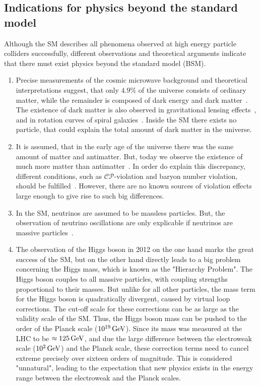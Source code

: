 \subsection{Indications for physics beyond the standard model}\label{sec:SM_bsm}
Although the SM describes all phenomena observed at high energy particle colliders successfully, different observations and theoretical arguments indicate that there must exist physics beyond the standard model (BSM).
\begin{enumerate}
 \item Precise measurements of the cosmic microwave background and theoretical interpretations suggest, that only $4.9\%$ of the universe consists of ordinary matter, while the remainder is composed of dark energy and dark matter~\cite{DarkMatterPlanck}. The existence of dark matter is also observed in gravitational lensing effects~\cite{DarkMatterLensing}, and in rotation curves of spiral galaxies~\cite{DarkMatterRotation}. Inside the SM there exists no particle, that could explain the total amount of dark matter in the universe.
 \item It is assumed, that in the early age of the universe there was the same amount of matter and antimatter. But, today we observe the existence of much more matter than antimatter~\cite{Antimatter,AsymSM}. In order do explain this discrepancy, different conditions, such as $\mathcal{CP}$-violation and baryon number violation, should be fulfilled~\cite{Sakharov}. However, there are no known sources of violation effects large enough to give rise to such big differences.
 \item In the SM, neutrinos are assumed to be massless particles. But, the observation of neutrino oscillations are only explicable if neutrinos are massive particles~\cite{NeutrinoMass,PDG}.
 \item The observation of the Higgs boson in 2012 on the one hand marks the great success of the SM, but on the other hand directly leads to a big problem concerning the Higgs mass, which is known as the "Hierarchy Problem". The Higgs boson couples to all massive particles, with coupling strengths proportional to their masses. But unlike for all other particles, the mass term for the Higgs boson is quadratically divergent, caused by virtual loop corrections. The cut-off scale for these corrections can be as large as the validity scale of the SM. Thus, the Higgs boson mass can be pushed to the order of the Planck scale ($10^{19}\,\text{Ge\hspace{-.08em}V}$). Since its mass was measured at the LHC to be $\approx 125\,\text{Ge\hspace{-.08em}V}$, and due the large difference between the electroweak scale ($10^2\,\text{Ge\hspace{-.08em}V}$) and the Planck scale, these correction terms need to cancel extreme precisely over sixteen orders of magnitude. This is considered "unnatural", leading to the expectation that new physics exists in the energy range between the electroweak and the Planck scales.

\end{enumerate}

